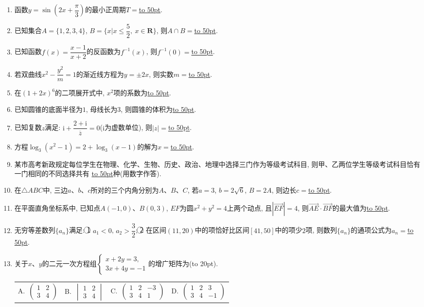 \documentclass[10pt,a4paper]{article}
\newcommand{\blank}[1]{\underline{\hbox to #1pt{}}}
\newcommand{\bracket}[1]{(\hbox to #1pt{})}
\newcommand{\fourch}[4]{\par\begin{tabular}{p{.23\textwidth}p{.23\textwidth}p{.23\textwidth}p{.23\textwidth}}
A.~#1 &B.~#2& C.~#3& D.~#4
\end{tabular}}
\begin{document}
\begin{enumerate}[1.]
\item 函数$y=\sin (2x+\dfrac{\pi}3)$的最小正周期$T=$\blank{50}.
\item 已知集合$A=\{1,2,3,4\}$, $B=\{x|x\le \dfrac 52, \ x\in \mathbf{R}\}$, 则$A\cap B=$\blank{50}.
\item 已知函数$f(x)=\dfrac{x-1}{x+2}$的反函数为$f^{-1}(x)$, 则$f^{-1}(0)=$\blank{50}.
\item 若双曲线$x^2-\dfrac{y^2}m=1$的渐近线方程为$y=\pm 2x$, 则实数$m=$\blank{50}.
\item 在$(1+2x)^6$的二项展开式中, $x^2$项的系数为\blank{50}.
\item 已知圆锥的底面半径为$1$, 母线长为$3$, 则圆锥的体积为\blank{50}.
\item 已知复数$z$满足: $\mathrm{i}+\dfrac{2+\mathrm{i}}{\overline z}=0$($\mathrm{i}$为虚数单位), 则$|z|=$\blank{50}.
\item 方程$\log_3(x^2-1)=2+\log_3(x-1)$的解为$x=$\blank{50}.
\item 某市高考新政规定每位学生在物理、化学、生物、历史、政治、地理中选择三门作为等级考试科目, 则甲、乙两位学生等级考试科目恰有一门相同的不同选择共有
\blank{50}种(用数字作答).
\item 在$\triangle ABC$中, 三边$a$、$b$、$c$所对的三个内角分别为$A$、$B$、$C$, 若$a=3$, $b=2\sqrt 6$, $B=2A$, 则边长$c=$\blank{50}.
\item 在平面直角坐标系中, 已知点$A(-1,0)$、$B(0,3)$, $EF$为圆$x^2+y^2=4$上两个动点, 且$|\overrightarrow{EF}|=4$, 则$\overrightarrow{AE}\cdot \overrightarrow{BF}$的最大值为\blank{50}.
\item 无穷等差数列$\{a_n\}$满足: \textcircled{1} $a_1<0$, $a_2>\dfrac 32$; \textcircled{2} 在区间$(11,20)$中的项恰好比区间$[41,50]$中的项少$2$项, 则数列$\{a_n\}$的通项公式为$a_n=$\blank{50}.
\item 关于$x$、$y$的二元一次方程组$\begin{cases}x+2y=3, \\ 3x+4y=-1 \end{cases}$的增广矩阵为\bracket{20}.
\fourch{$\begin{pmatrix}1 & 2  \\3 & 4  \end{pmatrix}$}{$\begin{vmatrix} 1 & 2  \\3 & 4  \end{vmatrix}$}{$\begin{pmatrix} 1 & 2 & -3 \\ 3 & 4 & 1\end{pmatrix}$}{$\begin{pmatrix}1 & 2 & 3 \\ 3 & 4 & -1\end{pmatrix}$}

\end{enumerate}
\end{document}
